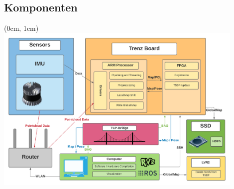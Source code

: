 \documentclass{beamer}
\begin{document}
\subsection{Komponenten}
\begin{frame}{\subsecname}
\begin{textblock*}{12.8cm}(0cm, 1cm)
\centering
\includegraphics[width=12cm]{images/Architecture.pdf}
\end{textblock*}
\end{frame}
\end{document}
